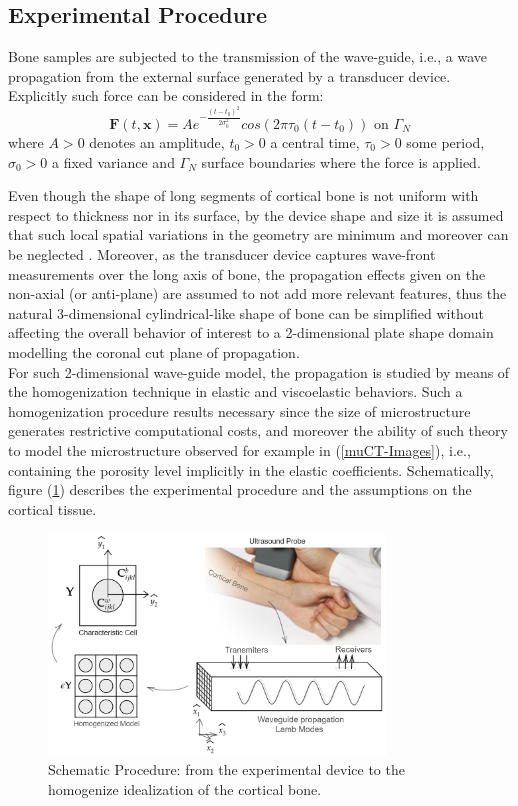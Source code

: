 \subsection{Experimental Procedure}
Bone samples are subjected to the transmission of the wave-guide, i.e., a wave propagation from the external surface generated by a transducer device. 
Explicitly such force can be considered in the form:
\begin{equation*}
    \mathbf{F}(t, \mathbf{x}) = A e^{-\frac{(t-t_0)^2}{2\sigma_0^2}} cos(2 \pi \tau_0 (t-t_0)) \text{ on } \Gamma_N
\end{equation*}
where $A > 0$ denotes an amplitude, $t_0 > 0$ a central time, $\tau_0>0$ some period, $\sigma_0>0$ a fixed variance and $\Gamma_N$ surface boundaries where the force is applied.

Even though the shape of long segments of cortical bone is not uniform with respect to thickness nor in its surface, by the device shape and size it is assumed that such local spatial variations in the geometry are minimum and moreover can be neglected \cite{Foiret2014}. Moreover, as the transducer device captures wave-front measurements over the long axis of bone, the propagation effects given on the non-axial (or anti-plane) are assumed to not add more relevant features, thus the natural 3-dimensional cylindrical-like shape of bone can be simplified without affecting the overall behavior of interest to a 2-dimensional plate shape domain modelling the coronal cut plane of propagation. \\

For such 2-dimensional wave-guide model, the propagation is studied by means of the homogenization technique in elastic and viscoelastic behaviors. Such a homogenization procedure results necessary since the size of microstructure generates restrictive computational costs, and moreover the ability of such theory to model the microstructure observed for example in (\ref{muCT-Images}), i.e., containing the porosity level implicitly in the elastic coefficients.  Schematically, figure (\ref{SchematicProp&Hom}) describes the experimental procedure and the assumptions on the cortical tissue. \\

\begin{figure}[!h]
	\centering
	\includegraphics[width=0.8\textwidth]{images/ImgExt/SchematicPropagation.png}
	\caption{Schematic Procedure: from the experimental device to the homogenize idealization of the cortical bone.}
	\label{SchematicProp&Hom}
\end{figure} 

